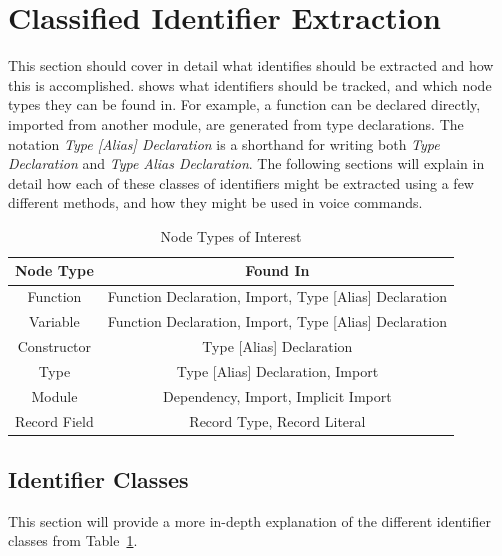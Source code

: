 \documentclass[../thesis.tex]{subfiles}
\begin{document}
\section{Classified Identifier Extraction}%
\label{sec:classified_identifier_extraction}
This section should cover in detail what identifies should be extracted
and how this is accomplished.  shows
what identifiers should be tracked, and which node types they can be found in.
For example, a function can be declared directly, imported from another module, are generated
from type declarations. The notation \textit{Type [Alias] Declaration} is a shorthand
for writing both \textit{Type Declaration} and \textit{Type Alias Declaration}.
The following sections will explain in detail how each of these classes of identifiers
might be extracted using a few different methods, and how they might be used in voice commands.

\begin{table}[htpb]
    \begin{tabular}{|c|c|}
        \hline
        Node Type & Found In \\
        \hline
        Function & Function Declaration, Import, Type [Alias] Declaration \\
        Variable & Function Declaration, Import, Type [Alias] Declaration \\
        Constructor & Type [Alias] Declaration \\
        Type & Type [Alias] Declaration, Import \\
        Module & Dependency, Import, Implicit Import \\
        Record Field & Record Type, Record Literal \\
        \hline
    \end{tabular}
    \caption{Node Types of Interest}
    \label{tab:constructs_of_interest}
\end{table}

\subsection{Identifier Classes}%
\label{sub:identifer_classes}
This section will provide a more in-depth explanation of the different identifier classes from Table~\ref{tab:constructs_of_interest}. 
\end{document}

